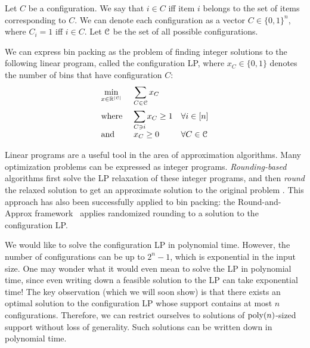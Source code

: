 Let $C$ be a configuration. We say that $i \in C$ iff
item $i$ belongs to the set of items corresponding to $C$.
We can denote each configuration as a vector $C \in \{0, 1\}^n$,
where $C_i = 1$ iff $i \in C$.
Let $\mathcal{C}$ be the set of all possible configurations.

We can express bin packing as the problem of finding integer solutions
to the following linear program, called the configuration LP,
where $x_C \in \{0, 1\}$ denotes the number of bins that have configuration $C$:
\[ \begin{array}{*3{>{\displaystyle}l}}
\min_{x \in \mathbb{R}^{|\Ccal|}} & \multicolumn{2}{>{\displaystyle}l}{\sum_{C \in \Ccal} x_C}
\\[1.5em] \textrm{where } & \sum_{C \ni i} x_C \ge 1 & \forall i \in [n]
\\[1em] \textrm{and } & x_C \ge 0 & \forall C \in \Ccal
\end{array} \]

Linear programs are a useful tool in the area of approximation algorithms.
Many optimization problems can be expressed as integer programs.
\emph{Rounding-based} algorithms first solve the LP relaxation of these integer programs,
and then \emph{round} the relaxed solution to get an approximate solution to the original problem
\cite{daa:det-lp-round,daa:rand-lp-round,iterative-methods}.
This approach has also been successfully applied to bin packing:
the Round-and-Approx framework~\cite{rna,bansal2014binpacking}
applies randomized rounding to a solution to the configuration LP.

We would like to solve the configuration LP in polynomial time.
However, the number of configurations can be up to $2^n-1$,
which is exponential in the input size.
One may wonder what it would even mean to solve the LP in polynomial time,
since even writing down a feasible solution to the LP can take exponential time!
The key observation (which we will soon show) is that
there exists an optimal solution to the configuration LP
whose support contains at most $n$ configurations.
Therefore, we can restrict ourselves to solutions of $\operatorname{poly}(n)$-sized support
without loss of generality. Such solutions can be written down in polynomial time.

